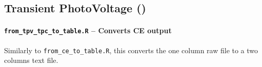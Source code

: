 
	\subsection{Transient PhotoVoltage ()}\label{r_tpv}

		\paragraph{\texttt{from\_tpv\_tpc\_to\_table.R} -- Converts CE output}
		Similarly to \texttt{from\_ce\_to\_table.R}, this converts the one column raw file to a two columns text file.

